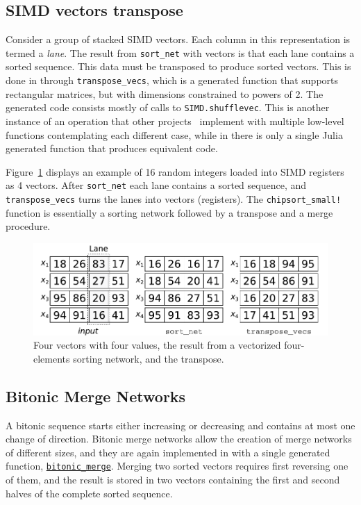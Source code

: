 \documentclass{juliacon}
\begin{document}
\subsection{SIMD vectors transpose}
%
Consider a group of stacked SIMD vectors. Each column in this representation is termed a {\em lane}. The result from {\tt sort\_net} with vectors is that each lane contains a sorted sequence. This data must be transposed to produce sorted vectors. This is done in \chipsort through {\tt transpose\_vecs}, which is a generated function that supports rectangular matrices, but with dimensions constrained to powers of 2. The generated code consists mostly of calls to {\tt SIMD.shufflevec}. This is another instance of an operation that other projects~\cite{DBLP:journals/pvldb/BalkesenATO13,ultrasort} implement with multiple low-level functions contemplating each different case, while in \chipsort there is only a single Julia generated function that produces equivalent code.

Figure~\ref{fig:transpose-vecs} displays an example of 16 random integers loaded into SIMD registers as 4 vectors. After {\tt sort\_net} each lane contains a sorted sequence, and {\tt transpose\_vecs} turns the lanes into vectors (registers). The {\tt chipsort\_small!} function is essentially a sorting network followed by a transpose and a merge procedure.

\begin{figure}[htb]
\centerline{\includegraphics[width=0.99\linewidth]{fig/regs.pdf}}
\caption{Four vectors with four values, the result from a vectorized four-elements sorting network, and the transpose.}
\label{fig:transpose-vecs}
\end{figure}

\subsection{Bitonic Merge Networks}
%
A bitonic sequence starts either increasing or decreasing and contains at most one change of direction. Bitonic merge networks allow the creation of merge networks of different sizes, and they are again implemented in \chipsort with a single generated function, \href{https://github.com/nlw0/ChipSort.jl/blob/10eb1a962e720aee2bf8733c832468b51a782c1a/src/bitonic-merge-network.jl#L12}{\tt bitonic\_merge}. Merging two sorted vectors requires first reversing one of them, and the result is stored in two vectors containing the first and second halves of the complete sorted sequence.
\end{document}
